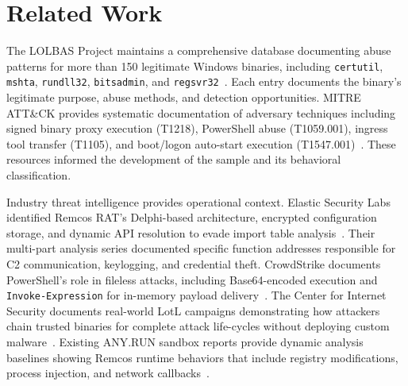 \documentclass[sigconf]{acmart}
\begin{document}

\section{Related Work}

\vspace{0.5em}
\qquad The LOLBAS Project maintains a comprehensive database documenting abuse patterns for more than 150 legitimate Windows binaries, including \texttt{certutil}, \texttt{mshta}, \texttt{rundll32}, \texttt{bitsadmin}, and \texttt{regsvr32}~\cite{lolbas2024project}. Each entry documents the binary's legitimate purpose, abuse methods, and detection opportunities. MITRE ATT\&CK provides systematic documentation of adversary techniques including signed binary proxy execution (T1218), PowerShell abuse (T1059.001), ingress tool transfer (T1105), and boot/logon auto-start execution (T1547.001)~\cite{mitre2024attack}. These resources informed the development of the sample and its behavioral classification.

\qquad Industry threat intelligence provides operational context. Elastic Security Labs identified Remcos RAT's Delphi-based architecture, encrypted configuration storage, and dynamic API resolution to evade import table analysis~\cite{elastic2024remcos}. Their multi-part analysis series documented specific function addresses responsible for C2 communication, keylogging, and credential theft. CrowdStrike documents PowerShell's role in fileless attacks, including Base64-encoded execution and \texttt{Invoke-Expression} for in-memory payload delivery~\cite{crowdstrike2024fileless}. The Center for Internet Security documents real-world LotL campaigns demonstrating how attackers chain trusted binaries for complete attack life-cycles without deploying custom malware~\cite{cis2024lotl}. Existing ANY.RUN sandbox reports provide dynamic analysis baselines showing Remcos runtime behaviors that include registry modifications, process injection, and network callbacks~\cite{anyrun2024remcos}.
\end{document}
